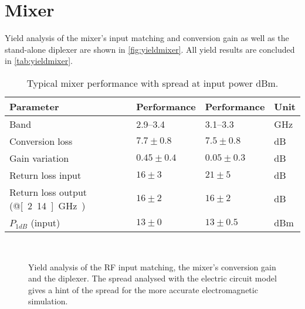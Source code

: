	\newpage
	\section{Mixer}
		Yield analysis of the mixer's input matching and conversion gain as well as the stand-alone diplexer are shown in \autoref{fig:yieldmixer}. All yield results are concluded in \autoref{tab:yieldmixer}.

		\begin{table}[hbt!]
			\caption[Mixer performance with spread.]{Typical mixer performance with spread at input power \unit[-2]{dBm}.}
			\label{tab:yieldmixer}
			\centering
			\begin{tabular}{ l l l l } \toprule
				Parameter & Performance & Performance & Unit \\\midrule
				Band & 2.9--3.4 & 3.1--3.3 & GHz \\\midrule
				Conversion loss & $7.7\pm 0.8$ & $7.5\pm 0.8$ & dB \\
				Gain variation & $0.45\pm 0.4$ & $0.05\pm 0.3$ & dB \\
				Return loss input & $16\pm 3$ & $21\pm 5$ & dB \\
				Return loss output (@\unit[2.14]{GHz}) & $16\pm 2$ & $16\pm 2$ & dB \\
				$P_{1dB}$ (input) & $13\pm 0$ & $13\pm 0.5$ & dBm \\\bottomrule
			\end{tabular}
		\end{table}

		\begin{figure}[hbt!]
			\centering
			\\
			\caption[Mixer yield analysis.]{Yield analysis of  the RF input matching,  the mixer's conversion gain and  the diplexer. The spread analysed with the electric circuit model gives a hint of the spread for the more accurate electromagnetic simulation.}\label{fig:yieldmixer}
		\end{figure}


